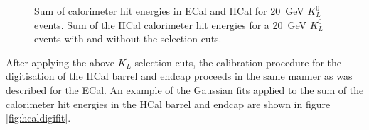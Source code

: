 \begin{figure}[h!]
\caption[\protect{} Sum of calorimeter hit energies in ECal and HCal for 20~GeV $K^{0}_{L}$ events.  \protect{} Sum of the HCal calorimeter hit energies for a 20~GeV $K^{0}_{L}$ events with and without the selection cuts.]{\protect{} Sum of calorimeter hit energies in ECal and HCal for 20~GeV $K^{0}_{L}$ events.  \protect{} Sum of the HCal calorimeter hit energies for a 20~GeV $K^{0}_{L}$ events with and without the selection cuts.}
\label{fig:hcaldigi}
\end{figure}

After applying the above $K^{0}_{L}$ selection cuts, the calibration procedure for the digitisation of the HCal barrel and endcap proceeds in the same manner as was described for the ECal.  An example of the Gaussian fits applied to the sum of the calorimeter hit energies in the HCal barrel and endcap are shown in figure \ref{fig:hcaldigifit}.  

